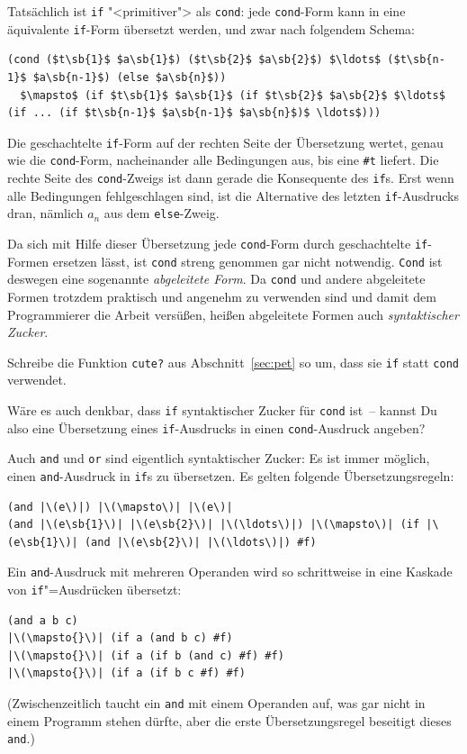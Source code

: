 Tatsächlich ist \lstinline{if} "<primitiver"> als
\lstinline{cond}: jede \lstinline{cond}-Form kann in eine äquivalente
\lstinline{if}-Form übersetzt werden, und zwar nach
folgendem Schema:
%
\begin{lstlisting}
(cond ($t\sb{1}$ $a\sb{1}$) ($t\sb{2}$ $a\sb{2}$) $\ldots$ ($t\sb{n-1}$ $a\sb{n-1}$) (else $a\sb{n}$))
  $\mapsto$ (if $t\sb{1}$ $a\sb{1}$ (if $t\sb{2}$ $a\sb{2}$ $\ldots$ (if ... (if $t\sb{n-1}$ $a\sb{n-1}$ $a\sb{n}$)$ \ldots$)))
\end{lstlisting}
%
Die geschachtelte \lstinline{if}-Form auf der rechten Seite der
Übersetzung wertet, genau wie die \lstinline{cond}-Form, nacheinander
alle Bedingungen aus, bis eine \lstinline{#t} liefert.  Die rechte Seite des
\lstinline{cond}-Zweigs ist dann gerade die Konsequente des \lstinline{if}s.
Erst wenn alle Bedingungen fehlgeschlagen sind, ist die Alternative des letzten
\lstinline{if}-Ausdrucks dran, nämlich $a_n$ aus dem \lstinline{else}-Zweig.

Da sich mit Hilfe dieser Übersetzung jede \lstinline{cond}-Form durch
geschachtelte \lstinline{if}-Formen ersetzen lässt, ist \lstinline{cond}
streng genommen gar nicht notwendig.  \lstinline{Cond} ist deswegen eine
sogenannte \textit{abgeleitete Form}.  Da \lstinline{cond} und andere
abgeleitete Formen trotzdem praktisch und angenehm zu verwenden sind
und damit dem Programmierer die Arbeit versüßen,
heißen abgeleitete Formen auch \textit{syntaktischer
  Zucker}.

\begin{aufgabeinline}
  Schreibe die Funktion \lstinline{cute?} aus Abschnitt~\ref{sec:pet} so
  um, dass sie \lstinline{if} statt  \lstinline{cond} verwendet.
\end{aufgabeinline}
%
\begin{aufgabeinline}
  Wäre es auch denkbar, dass \lstinline{if} syntaktischer Zucker für
  \lstinline{cond} ist~-- kannst Du also eine Übersetzung eines
  \lstinline{if}-Ausdrucks in einen \lstinline{cond}-Ausdruck angeben?
\end{aufgabeinline}

Auch \lstinline{and} und \lstinline{or} sind eigentlich syntaktischer Zucker:
Es ist immer möglich, einen \lstinline{and}-Ausdruck in \lstinline{if}s
zu übersetzen.  Es gelten folgende Übersetzungsregeln:
%
\begin{lstlisting}
(and |\(e\)|) |\(\mapsto\)| |\(e\)|
(and |\(e\sb{1}\)| |\(e\sb{2}\)| |\(\ldots\)|) |\(\mapsto\)| (if |\(e\sb{1}\)| (and |\(e\sb{2}\)| |\(\ldots\)|) #f)
\end{lstlisting}
%
Ein \lstinline{and}-Ausdruck mit mehreren Operanden wird so schrittweise
in eine Kaskade von \lstinline{if}"=Ausdrücken übersetzt:
%
\begin{lstlisting}
(and a b c)
|\(\mapsto{}\)| (if a (and b c) #f)
|\(\mapsto{}\)| (if a (if b (and c) #f) #f)
|\(\mapsto{}\)| (if a (if b c #f) #f)
\end{lstlisting}
%
(Zwischenzeitlich taucht ein \texttt{and} mit einem Operanden auf, was
gar nicht in einem Programm stehen dürfte, aber die erste
Übersetzungsregel beseitigt dieses \texttt{and}.)

